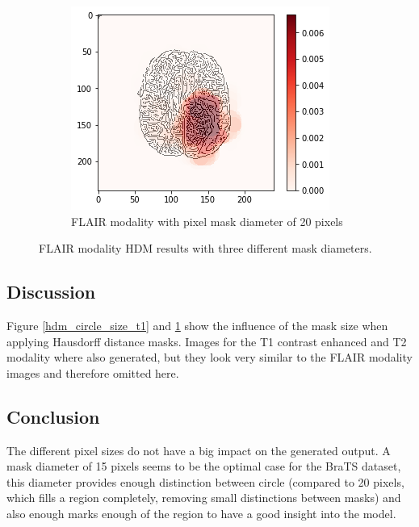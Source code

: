 \begin{figure}[H]
    \begin{subfigure}{.32\textwidth}
    \centering
        \includegraphics[width=\linewidth]{chapters/06_hdm/circle20/18.png}
        \caption{FLAIR modality with pixel mask diameter of 20 pixels}
    \end{subfigure}
    \caption{FLAIR modality HDM results with three different mask diameters.}
    \label{hdm_circle_size_flair}
\end{figure}

\subsection{Discussion}
Figure \ref{hdm_circle_size_t1} and \ref{hdm_circle_size_flair} show the influence of the mask size when applying Hausdorff distance masks.
Images for the T1 contrast enhanced and T2 modality where also generated, but they look very similar to the FLAIR modality images and therefore omitted here.

\subsection{Conclusion}
The different pixel sizes do not have a big impact on the generated output. A mask diameter of 15 pixels seems to be the optimal case for the BraTS dataset, this diameter
provides enough distinction between circle (compared to 20 pixels, which fills a region completely, removing small distinctions between masks) and also enough
marks enough of the region to have a good insight into the model.
